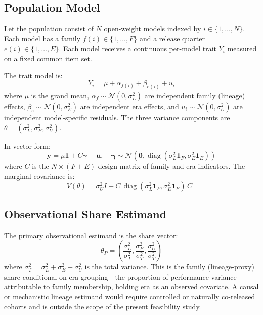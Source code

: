 \documentclass[11pt]{article}
\theoremstyle{definition}
\theoremstyle{plain}
\begin{document}
\subsection{Population Model}
Let the population consist of $N$ open-weight models indexed by $i \in \{1, \ldots, N\}$. Each model has a family $f(i) \in \{1, \ldots, F\}$ and a release quarter $e(i) \in \{1, \ldots, E\}$. Each model receives a continuous per-model trait $Y_i$ measured on a fixed common item set.

The trait model is:
\begin{equation}
Y_i = \mu + \alpha_{f(i)} + \beta_{e(i)} + u_i
\label{eq:model}
\end{equation}
where $\mu$ is the grand mean, $\alpha_f \sim \mathcal{N}(0, \sigma^2_L)$ are independent family (lineage) effects, $\beta_e \sim \mathcal{N}(0, \sigma^2_E)$ are independent era effects, and $u_i \sim \mathcal{N}(0, \sigma^2_U)$ are independent model-specific residuals. The three variance components are $\theta = (\sigma^2_L, \sigma^2_E, \sigma^2_U)$.

In vector form:
\begin{equation}
\mathbf{y} = \mu \mathbf{1} + C \boldsymbol{\gamma} + \mathbf{u}, \quad \boldsymbol{\gamma} \sim \mathcal{N}(\mathbf{0}, \operatorname{diag}(\sigma^2_L \mathbf{1}_F, \sigma^2_E \mathbf{1}_E))
\label{eq:vector}
\end{equation}
where $C$ is the $N \times (F + E)$ design matrix of family and era indicators. The marginal covariance is:
\begin{equation}
V(\theta) = \sigma^2_U I + C \, \operatorname{diag}(\sigma^2_L \mathbf{1}_F, \sigma^2_E \mathbf{1}_E) \, C^\top
\label{eq:cov}
\end{equation}

\subsection{Observational Share Estimand}
The primary observational estimand is the share vector:
\begin{equation}
\theta_P = \left( \frac{\sigma^2_L}{\sigma^2_T}, \frac{\sigma^2_E}{\sigma^2_T}, \frac{\sigma^2_U}{\sigma^2_T} \right)
\label{eq:thetaP}
\end{equation}
where $\sigma^2_T = \sigma^2_L + \sigma^2_E + \sigma^2_U$ is the total variance. This is the family (lineage-proxy) share conditional on era grouping---the proportion of performance variance attributable to family membership, holding era as an observed covariate. A causal or mechanistic lineage estimand would require controlled or naturally co-released cohorts and is outside the scope of the present feasibility study.
\end{document}

